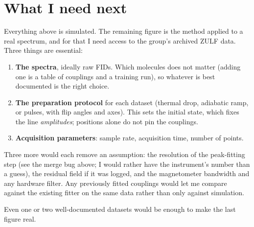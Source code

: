 \documentclass[11pt,a4paper]{article}
\begin{document}
\section{What I need next}

Everything above is simulated. The remaining figure is the method applied to a
real spectrum, and for that I need access to the group's archived ZULF data.
Three things are essential:

\begin{enumerate}
\item \textbf{The spectra}, ideally raw FIDs. Which molecules does not matter
      (adding one is a table of couplings and a training run), so
      whatever is best documented is the right choice.
\item \textbf{The preparation protocol} for each dataset (thermal drop,
      adiabatic ramp, or pulses, with flip angles and axes). This sets the
      initial state, which fixes the line \emph{amplitudes}; positions alone do
      not pin the couplings.
\item \textbf{Acquisition parameters}: sample rate, acquisition time, number of
      points.
\end{enumerate}

Three more would each remove an assumption: the resolution of the peak-fitting
step (see the merge bug above; I would rather have the instrument's number
than a guess), the residual field if it was logged, and the magnetometer
bandwidth and any hardware filter. Any previously fitted couplings would let me
compare against the existing fitter on the same data rather than only against
simulation.

Even one or two well-documented datasets would be enough to make the last figure
real.
\end{document}
